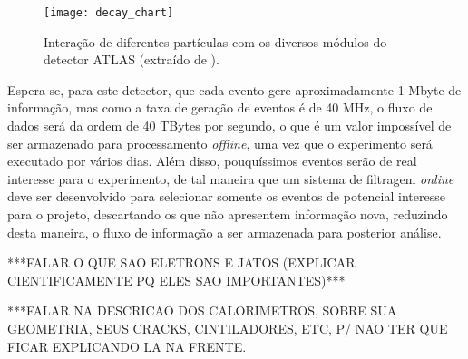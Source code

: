\begin{figure}
\begin{center}
\texttt{[image: decay\_chart]}
\caption[Interação de diferentes partículas com os diversos módulos do detector ATLAS.]{Interação de diferentes partículas com os diversos módulos do detector ATLAS (extraído de \cite{bib:site_atlas}).}
\label{FIG:INTERACAO_PARTICULAS_ATLAS}
\end{center}
\end{figure}


Espera-se, para este detector, que cada evento gere aproximadamente 1 Mbyte de informação, mas como a taxa de geração de eventos é de 40 MHz, o fluxo de dados será da ordem de 40 TBytes por segundo, o que é um valor impossível de ser armazenado para processamento \emph{offline}, uma vez que o experimento será executado por vários dias. Além disso, pouquíssimos eventos serão de real interesse para o experimento, de tal maneira que um sistema de filtragem \emph{online} deve ser desenvolvido para selecionar somente os eventos de potencial interesse para o projeto, descartando os que não apresentem informação nova, reduzindo desta maneira, o fluxo de informação a ser armazenada para posterior análise.


\huge
***FALAR O QUE SAO ELETRONS E JATOS (EXPLICAR CIENTIFICAMENTE PQ ELES SAO IMPORTANTES)***

***FALAR NA DESCRICAO DOS CALORIMETROS, SOBRE SUA GEOMETRIA, SEUS CRACKS, CINTILADORES, ETC, P/ NAO TER QUE FICAR EXPLICANDO LA NA FRENTE.
\normalsize
